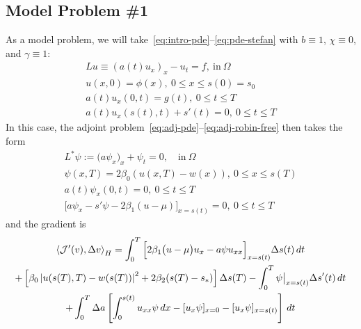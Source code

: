 \documentclass[letterpaper, 10pt]{amsart}
\theoremstyle{definition}
\theoremstyle{remark}
\newcommand{\lnorm}[1]{\left\vert #1\right\vert}%
\begin{document}
\subsection{Model Problem \#1}
As a model problem, we will take~\eqref{eq:intro-pde}--\eqref{eq:pde-stefan} with $b\equiv 1$, $\chi \equiv 0$, and $\gamma \equiv 1$:
\begin{gather}
  Lu \equiv {(a(t) u_x)}_x - u_{t} = f,~\text{in}~\Omega
  \\
  u(x,0) = \phi (x),~0 \leq x \leq s(0) = s_0
  \\
  a(t) u_x (0,t) = g(t),~0 \leq t \leq T
  \\
  a(t) u_x (s(t),t) + s'(t) = 0,~0 \leq t \leq
  T
\end{gather}
In this case, the adjoint problem~\eqref{eq:adj-pde}--\eqref{eq:adj-robin-free} then takes the form
\begin{gather}
  L^{*} \psi := \big(a \psi_x\big)_x + \psi_t = 0,\quad\text{in}~\Omega
  \\
  \psi(x, T) = 2\beta_0(u(x, T) - w(x)),~0 \leq x \leq s(T)
  \\
  a(t)\psi_x(0, t) =0,~0 \leq t \leq T
  \\
  \Big[a \psi_x - s'\psi - 2\beta_1(u - \mu)\Big]_{x=s(t)}=0, ~0 \leq t \leq T
\end{gather}
and the gradient is
\begin{gather}
  \left\langle \J'(v),\Delta v \right\rangle_H
  = \int_0^T \Big[2\beta_1\big(u - \mu\big)u_x - a \psi u_{xx} \Big]_{x=s(t)} {\Delta s}(t)\,dt \nonumber
  \\
  +
  \left[\beta_0\lnorm{u(s(T),T) - w(s(T))}^2 + 2 \beta_2 (s(T) - s_*)\right] {\Delta s}(T)
  - \int_0^T \psi \big\vert_{x=s(t)} {\Delta s}'(t) \,dt\nonumber
  \\
  + \int_0^T {\Delta a} \left[
    \int_0^{s(t)}  u_{xx} \psi \,dx
    - [u_x \psi]_{x=0}
    - [u_x\psi]_{x=s(t)}
  \right]\,dt
\end{gather}
\end{document}
